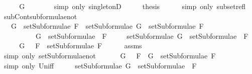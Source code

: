 \begin{isabellebody}
\ \ \isamarkupfalse%
\ \isamarkupfalse%
\ {\isachardoublequoteopen}G\ {\isacharequal}\ {\isasymbottom}{\isachardoublequoteclose}\isanewline
\ \ \ \ \isamarkupfalse%
\ {\isacharparenleft}simp\ only{\isacharcolon}\ singletonD{\isacharparenright}\isanewline
\ \ \isamarkupfalse%
\ \isamarkupfalse%
\ {\isacharquery}thesis\isanewline
\ \ \ \ \isamarkupfalse%
\ {\isacharparenleft}simp\ only{\isacharcolon}\ subset{\isacharunderscore}refl{\isacharparenright}\isanewline
{}\isamarkupfalse%
%
\endisatagproof
{\isafoldproof}%
%
\isadelimproof
\isanewline
%
\endisadelimproof
\isanewline
{}\isamarkupfalse%
\ subContsubformulae{\isacharunderscore}not{\isacharcolon}\isanewline
\ \ \ {\isachardoublequoteopen}G\ {\isasymin}\ setSubformulae\ F\ {\isasymLongrightarrow}\ setSubformulae\ G\ {\isasymsubseteq}\ setSubformulae\ F{\isachardoublequoteclose}\isanewline
\ \ \ \ \ \ \ \ \ \ {\isachardoublequoteopen}G\ {\isasymin}\ setSubformulae\ {\isacharparenleft}\isactrlbold {\isasymnot}\ F{\isacharparenright}{\isachardoublequoteclose}\isanewline
\ \ \ \ \ {\isachardoublequoteopen}setSubformulae\ G\ {\isasymsubseteq}\ setSubformulae\ {\isacharparenleft}\isactrlbold {\isasymnot}\ F{\isacharparenright}{\isachardoublequoteclose}\isanewline
%
\isadelimproof
%
\endisadelimproof
%
\isatagproof
{}\isamarkupfalse%
\ {\isacharminus}\isanewline
\ \ \isamarkupfalse%
\ {\isachardoublequoteopen}G\ {\isasymin}\ {\isacharbraceleft}\isactrlbold {\isasymnot}\ F{\isacharbraceright}\ {\isasymunion}\ setSubformulae\ F{\isachardoublequoteclose}\isanewline
\ \ \ \ \isamarkupfalse%
\ assms{\isacharparenleft}{}{\isacharparenright}\isanewline
\ \ \ \ \isamarkupfalse%
\ {\isacharparenleft}simp\ only{\isacharcolon}\ setSubformulae{\isacharunderscore}not{\isacharparenright}\ \isanewline
\ \ \isamarkupfalse%
\ \isamarkupfalse%
\ {\isachardoublequoteopen}G\ {\isasymin}\ {\isacharbraceleft}\isactrlbold {\isasymnot}\ F{\isacharbraceright}\ {\isasymor}\ G\ {\isasymin}\ setSubformulae\ F{\isachardoublequoteclose}\isanewline
\ \ \ \ \isamarkupfalse%
\ {\isacharparenleft}simp\ only{\isacharcolon}\ Un{\isacharunderscore}iff{\isacharparenright}\isanewline
\ \ \isamarkupfalse%
\ \isamarkupfalse%
\ {\isachardoublequoteopen}setSubformulae\ G\ {\isasymsubseteq}\ setSubformulae\ {\isacharparenleft}\isactrlbold {\isasymnot}\ F{\isacharparenright}{\isachardoublequoteclose}\isanewline

\end{isabellebody}
